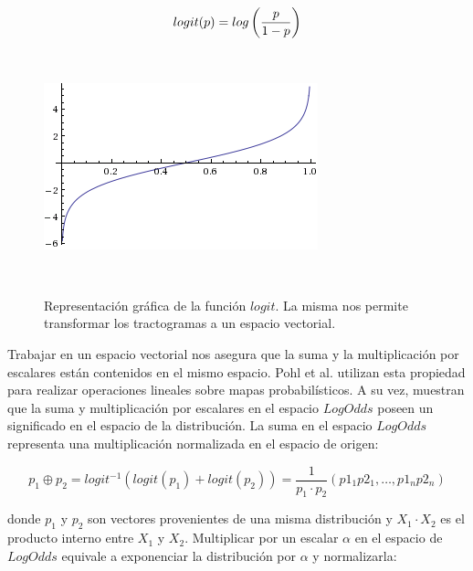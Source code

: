\begin{figure}[h!]

\begin{minipage}[b]{0.45\textwidth}

    \begin{equation}
    \vspace{2.85cm}
        \label{eq:logit}
    logit(p) = log\left(\frac{p}{1-p}\right)
    \end{equation}
\end{minipage} ~
\hfill
\begin{minipage}[b]{0.45\textwidth}
    \includegraphics[width=\textwidth]{img/logit.png}
    \caption{Representaci\'on gr\'afica de la funci\'on $logit$. La misma
             nos permite transformar los tractogramas a un espacio
             vectorial. }
    \label{fig:dominio}
\end{minipage} ~

\end{figure}  

Trabajar en un espacio vectorial nos asegura que la suma y la 
multiplicaci\'on por escalares est\'an contenidos en el mismo espacio.
Pohl et al. \cite{Pohl2007} utilizan esta propiedad para realizar
operaciones lineales sobre mapas probabil\'isticos. A su vez, muestran
que la suma y multiplicaci\'on por escalares en el espacio $LogOdds$ 
poseen un significado en el espacio de la distribuci\'on. La suma en el
espacio $LogOdds$ representa una multiplicaci\'on normalizada en el
espacio de origen:

$$ p_1 \oplus p_2 = logit^{-1} ( logit(p_1) + logit(p_2) ) = 
   \frac{1}{ p_1 \cdot p_2 } (p1_1 p2_1, \dots, p1_n p2_n) $$

donde $p_1$ y $p_2$ son vectores provenientes de una misma distribuci\'on y
$X_1 \cdot X_2$ es el producto interno entre $X_1$ y $X_2$. Multiplicar
por un escalar $\alpha$ en el espacio de $LogOdds$ equivale a exponenciar
la distribuci\'on por $\alpha$ y normalizarla:

